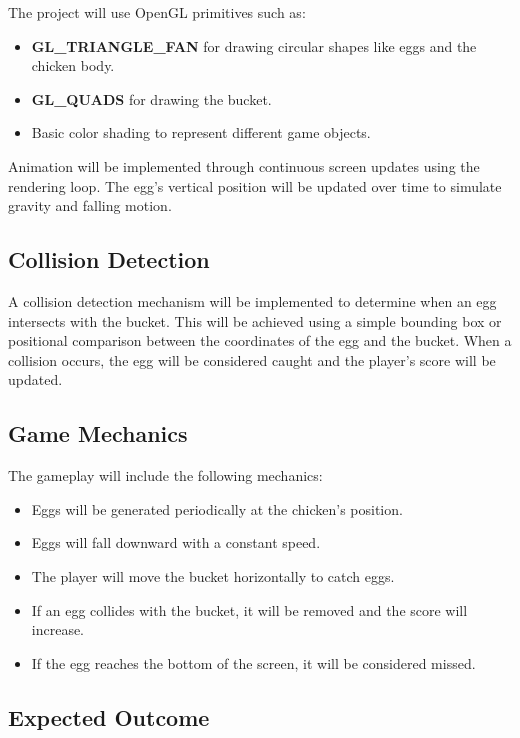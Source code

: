 \documentclass[12pt]{article}
\begin{document}
The project will use OpenGL primitives such as:

\begin{itemize}
\item \textbf{GL\_TRIANGLE\_FAN} for drawing circular shapes like eggs and the chicken body.
\item \textbf{GL\_QUADS} for drawing the bucket.
\item Basic color shading to represent different game objects.
\end{itemize}

Animation will be implemented through continuous screen updates using the rendering loop. The egg's vertical position will be updated over time to simulate gravity and falling motion.

\subsection{Collision Detection}

A collision detection mechanism will be implemented to determine when an egg intersects with the bucket. This will be achieved using a simple bounding box or positional comparison between the coordinates of the egg and the bucket. When a collision occurs, the egg will be considered caught and the player's score will be updated.

\subsection{Game Mechanics}

The gameplay will include the following mechanics:

\begin{itemize}
\item Eggs will be generated periodically at the chicken's position.
\item Eggs will fall downward with a constant speed.
\item The player will move the bucket horizontally to catch eggs.
\item If an egg collides with the bucket, it will be removed and the score will increase.
\item If the egg reaches the bottom of the screen, it will be considered missed.
\end{itemize}

\subsection{Expected Outcome}
\end{document}
